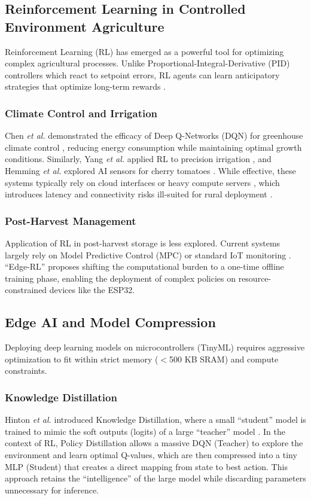 \documentclass[conference]{IEEEtran}
\begin{document}
\subsection{Reinforcement Learning in Controlled Environment Agriculture}
Reinforcement Learning (RL) has emerged as a powerful tool for optimizing complex agricultural processes. Unlike Proportional-Integral-Derivative (PID) controllers which react to setpoint errors, RL agents can learn anticipatory strategies that optimize long-term rewards \cite{overweg2021cropgym}.

\subsubsection{Climate Control and Irrigation}
Chen \textit{et al.} demonstrated the efficacy of Deep Q-Networks (DQN) for greenhouse climate control \cite{chen2022greenhouse}, reducing energy consumption while maintaining optimal growth conditions. Similarly, Yang \textit{et al.} applied RL to precision irrigation \cite{yang2020irrigation}, and Hemming \textit{et al.} explored AI sensors for cherry tomatoes \cite{hemming2020greenhouse}. While effective, these systems typically rely on cloud interfaces or heavy compute servers \cite{ray2017}, which introduces latency and connectivity risks ill-suited for rural deployment \cite{prasad2018}.

\subsubsection{Post-Harvest Management}
Application of RL in post-harvest storage is less explored. Current systems largely rely on Model Predictive Control (MPC) or standard IoT monitoring \cite{li2021edgeai}. ``Edge-RL'' proposes shifting the computational burden to a one-time offline training phase, enabling the deployment of complex policies on resource-constrained devices like the ESP32.

\subsection{Edge AI and Model Compression}
Deploying deep learning models on microcontrollers (TinyML) requires aggressive optimization to fit within strict memory ($<$500 KB SRAM) and compute constraints.

\subsubsection{Knowledge Distillation}
Hinton \textit{et al.} introduced Knowledge Distillation, where a small ``student'' model is trained to mimic the soft outputs (logits) of a large ``teacher'' model \cite{hinton2015distilling}. In the context of RL, Policy Distillation \cite{ruffy2019distilling} allows a massive DQN (Teacher) to explore the environment and learn optimal Q-values, which are then compressed into a tiny MLP (Student) that creates a direct mapping from state to best action. This approach retains the ``intelligence'' of the large model while discarding parameters unnecessary for inference.
\end{document}
